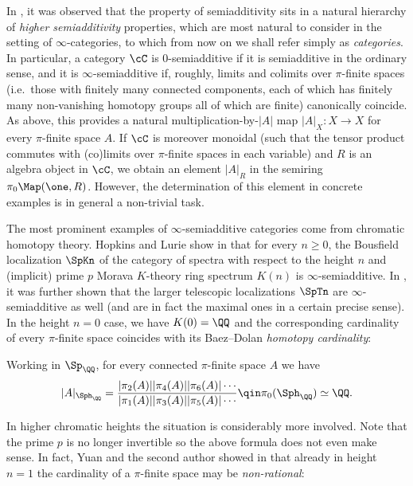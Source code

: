 \documentclass[english]{article}
\begin{document}
In \cite{AmbiKn}, it was observed that the property of semiadditivity sits in a natural hierarchy of \textit{higher semiadditivity} properties, which are most natural to consider in the setting of $\infty$-categories, to which from now on we shall refer simply as \textit{categories}.
In particular, a category $\cC$ is $0$-semiadditive if it is semiadditive in the ordinary sense, and it is $\infty$-semiadditive if, roughly, limits and colimits over $\pi$-finite spaces (i.e.\ those with finitely many connected components, each of which has finitely many non-vanishing homotopy groups all of which are finite)
canonically coincide. As above, this provides a natural multiplication-by-$|A|$ map $|A|_X\colon X \to X$ for every $\pi$-finite space $A$. 
If $\cC$ is moreover monoidal (such that the tensor product commutes with (co)limits over $\pi$-finite spaces in each variable) and $R$ is an algebra object in $\cC$, we obtain an element $|A|_R$ in the semiring $\pi_0\Map(\one, R)$. However, the determination of this element in concrete examples is in general a non-trivial task. 

The most prominent examples of $\infty$-semiadditive categories come from chromatic homotopy theory. Hopkins and Lurie show in \cite{AmbiKn} that for every $n \ge 0$, the Bousfield localization $\SpKn$ of the category of spectra with respect to the height $n$ and (implicit) prime $p$ Morava $K$-theory ring spectrum $K(n)$ is $\infty$-semiadditive. In \cite{TeleAmbi}, it was further shown that the larger telescopic localizations $\SpTn$ are $\infty$-semiadditive as well (and are in fact the maximal ones in a certain precise sense).
In the height $n=0$ case, we have $K(0) = \QQ$ and the corresponding cardinality of every $\pi$-finite space coincides with its Baez--Dolan \textit{homotopy cardinality}:

\begin{example}\label{htpy-card}
    Working in $\Sp_\QQ$, for every connected $\pi$-finite space $A$ we have
    \[
        |A|_{\Sph_\QQ} = \frac{|\pi_2(A)| |\pi_4(A)| |\pi_6(A)| \cdots}{|\pi_1(A)| |\pi_3(A)| |\pi_5(A)| \cdots}
        \qin \pi_0(\Sph_\QQ) \simeq \QQ.
    \]
\end{example}

In higher chromatic heights the situation is considerably more involved. Note that the prime $p$ is no longer invertible so the above formula does not even make sense. In fact, Yuan and the second author showed in \cite{CarmeliYuan} that already in height $n=1$ the cardinality of a $\pi$-finite space may be \textit{non-rational}:
\end{document}
